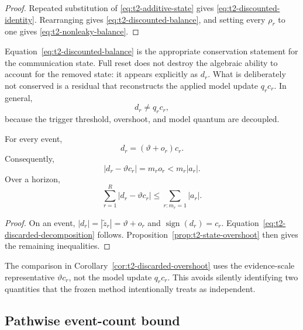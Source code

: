 \begin{proof}
Repeated substitution of \eqref{eq:t2-additive-state} gives \eqref{eq:t2-discounted-identity}. Rearranging gives \eqref{eq:t2-discounted-balance}, and setting every $\rho_r$ to one gives \eqref{eq:t2-nonleaky-balance}.
\end{proof}

Equation~\eqref{eq:t2-discounted-balance} is the appropriate conservation statement for the communication state. Full reset does not destroy the algebraic ability to account for the removed state: it appears explicitly as $d_r$. What is deliberately not conserved is a residual that reconstructs the applied model update $q_rc_r$. In general,
\begin{equation}
    d_r\neq q_rc_r,
\end{equation}
because the trigger threshold, overshoot, and model quantum are decoupled.

\begin{corollary}
\label{cor:t2-discarded-overshoot}
For every event,
\begin{equation}
    d_r=(\vartheta+o_r)c_r.
    \label{eq:t2-discarded-decomposition}
\end{equation}
Consequently,
\begin{equation}
    |d_r-\vartheta c_r|
    =
    m_ro_r
    <
    m_r|a_r|.
    \label{eq:t2-threshold-representative-error}
\end{equation}
Over a horizon,
\begin{equation}
    \sum_{r=1}^{R}|d_r-\vartheta c_r|
    \leq
    \sum_{r:m_r=1}|a_r|.
    \label{eq:t2-total-overshoot}
\end{equation}
\end{corollary}

\begin{proof}
On an event, $|d_r|=|\widetilde z_r|=\vartheta+o_r$ and $\operatorname{sign}(d_r)=c_r$. Equation~\eqref{eq:t2-discarded-decomposition} follows. Proposition~\ref{prop:t2-state-overshoot} then gives the remaining inequalities.
\end{proof}

The comparison in Corollary~\ref{cor:t2-discarded-overshoot} uses the evidence-scale representative $\vartheta c_r$, not the model update $q_rc_r$. This avoids silently identifying two quantities that the frozen method intentionally treats as independent.

\subsection{Pathwise event-count bound}

